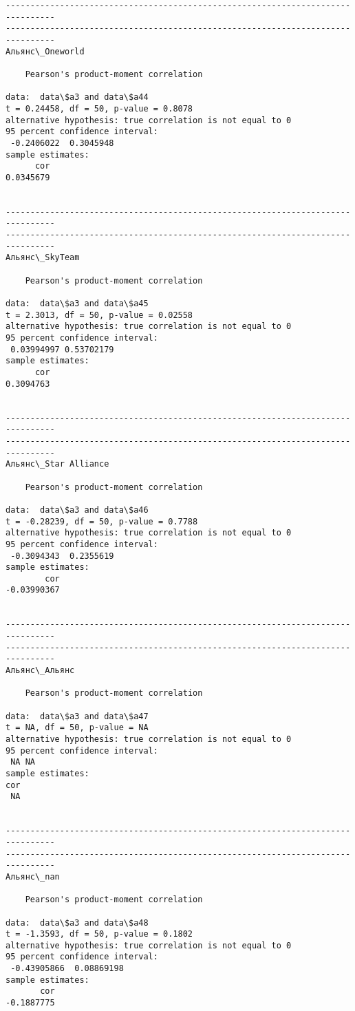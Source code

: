 \documentclass[11pt,mathletters]{article}
\begin{document}
\begin{Verbatim}[commandchars=\\\{\}]
--------------------------------------------------------------------------------
--------------------------------------------------------------------------------
Альянс\_Oneworld

	Pearson's product-moment correlation

data:  data\$a3 and data\$a44
t = 0.24458, df = 50, p-value = 0.8078
alternative hypothesis: true correlation is not equal to 0
95 percent confidence interval:
 -0.2406022  0.3045948
sample estimates:
      cor 
0.0345679 


--------------------------------------------------------------------------------
--------------------------------------------------------------------------------
Альянс\_SkyTeam

	Pearson's product-moment correlation

data:  data\$a3 and data\$a45
t = 2.3013, df = 50, p-value = 0.02558
alternative hypothesis: true correlation is not equal to 0
95 percent confidence interval:
 0.03994997 0.53702179
sample estimates:
      cor 
0.3094763 


--------------------------------------------------------------------------------
--------------------------------------------------------------------------------
Альянс\_Star Alliance 

	Pearson's product-moment correlation

data:  data\$a3 and data\$a46
t = -0.28239, df = 50, p-value = 0.7788
alternative hypothesis: true correlation is not equal to 0
95 percent confidence interval:
 -0.3094343  0.2355619
sample estimates:
        cor 
-0.03990367 


--------------------------------------------------------------------------------
--------------------------------------------------------------------------------
Альянс\_Альянс

	Pearson's product-moment correlation

data:  data\$a3 and data\$a47
t = NA, df = 50, p-value = NA
alternative hypothesis: true correlation is not equal to 0
95 percent confidence interval:
 NA NA
sample estimates:
cor 
 NA 


--------------------------------------------------------------------------------
--------------------------------------------------------------------------------
Альянс\_nan

	Pearson's product-moment correlation

data:  data\$a3 and data\$a48
t = -1.3593, df = 50, p-value = 0.1802
alternative hypothesis: true correlation is not equal to 0
95 percent confidence interval:
 -0.43905866  0.08869198
sample estimates:
       cor 
-0.1887775 



\end{Verbatim}
\end{document}
